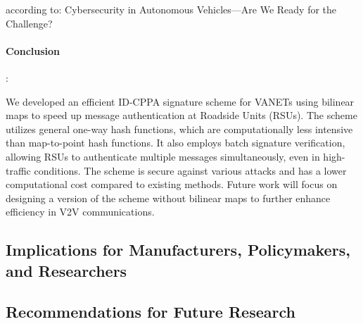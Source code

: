 according to: Cybersecurity in Autonomous Vehicles—Are We Ready for
the Challenge?
\cite{durlik2022cybersecurity}


\paragraph{Conclusion}:

We developed an efficient ID-CPPA signature scheme for VANETs using bilinear maps to speed up message authentication at Roadside Units (RSUs).
The scheme utilizes general one-way hash functions, which are computationally less intensive than map-to-point hash functions.
It also employs batch signature verification, allowing RSUs to authenticate multiple messages simultaneously, even in high-traffic conditions.
The scheme is secure against various attacks and has a lower computational cost compared to existing methods.
Future work will focus on designing a version of the scheme without bilinear maps to further enhance efficiency in V2V communications.





\subsection{Implications for Manufacturers, Policymakers, and Researchers}\label{subsec:implications-for-manufacturers-policymakers-and-researchers}
\subsection{Recommendations for Future Research}\label{subsec:recommendations-for-future-research}
